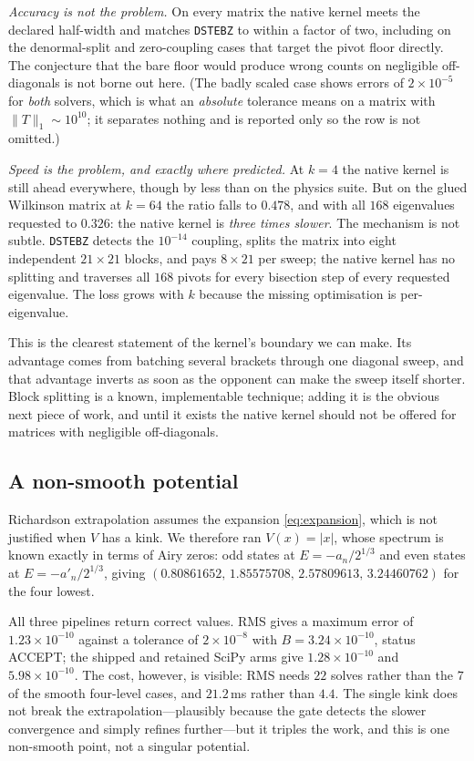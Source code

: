 \documentclass[twocolumn,10pt,a4paper]{article}
\theoremstyle{plain}
\theoremstyle{definition}
\newcommand{\ACCEPT}{\textsf{ACCEPT}}
\begin{document}
\emph{Accuracy is not the problem.} On every matrix the native kernel meets the
declared half-width and matches \texttt{DSTEBZ} to within a factor of two,
including on the denormal-split and zero-coupling cases that target the pivot
floor directly. The conjecture that the bare floor would produce wrong counts on
negligible off-diagonals is not borne out here. (The badly scaled case shows
errors of $2\times10^{-5}$ for \emph{both} solvers, which is what an
\emph{absolute} tolerance means on a matrix with $\|T\|_{1}\sim10^{10}$; it
separates nothing and is reported only so the row is not omitted.)

\emph{Speed is the problem, and exactly where predicted.} At $k=4$ the native
kernel is still ahead everywhere, though by less than on the physics suite. But
on the glued Wilkinson matrix at $k=64$ the ratio falls to $0.478$, and with all
$168$ eigenvalues requested to $0.326$: the native kernel is \emph{three times
slower}. The mechanism is not subtle. \texttt{DSTEBZ} detects the $10^{-14}$
coupling, splits the matrix into eight independent $21\times21$ blocks, and pays
$8\times21$ per sweep; the native kernel has no splitting and traverses all
$168$ pivots for every bisection step of every requested eigenvalue. The loss
grows with $k$ because the missing optimisation is per-eigenvalue.

This is the clearest statement of the kernel's boundary we can make. Its
advantage comes from batching several brackets through one diagonal sweep, and
that advantage inverts as soon as the opponent can make the sweep itself
shorter. Block splitting is a known, implementable technique; adding it is the
obvious next piece of work, and until it exists the native kernel should not be
offered for matrices with negligible off-diagonals.

\subsection{A non-smooth potential}
\label{sec:advnonsmooth}

Richardson extrapolation assumes the expansion \eqref{eq:expansion}, which is
not justified when $V$ has a kink. We therefore ran $V(x) = |x|$, whose spectrum
is known exactly in terms of Airy zeros: odd states at $E = -a_{n}/2^{1/3}$ and
even states at $E = -a'_{n}/2^{1/3}$, giving
$(0.80861652,\,1.85575708,\,2.57809613,\,3.24460762)$ for the four lowest.

All three pipelines return correct values. RMS gives a maximum error of
$1.23\times10^{-10}$ against a tolerance of $2\times10^{-8}$ with
$B = 3.24\times10^{-10}$, status \ACCEPT{}; the shipped and retained SciPy arms
give $1.28\times10^{-10}$ and $5.98\times10^{-10}$. The cost, however, is
visible: RMS needs $22$ solves rather than the $7$ of the smooth four-level
cases, and $21.2$\,ms rather than $4.4$. The single kink does not break the
extrapolation---plausibly because the gate detects the slower convergence and
simply refines further---but it triples the work, and this is one non-smooth
point, not a singular potential.
\end{document}
